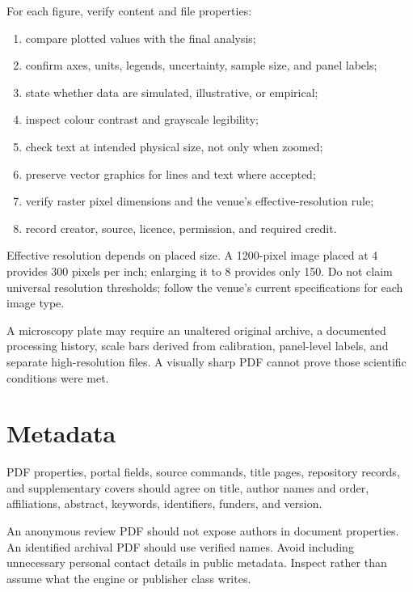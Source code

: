 For each figure, verify content and file properties:

\begin{enumerate}
  \item compare plotted values with the final analysis;
  \item confirm axes, units, legends, uncertainty, sample size, and panel labels;
  \item state whether data are simulated, illustrative, or empirical;
  \item inspect colour contrast and grayscale legibility;
  \item check text at intended physical size, not only when zoomed;
  \item preserve vector graphics for lines and text where accepted;
  \item verify raster pixel dimensions and the venue's effective-resolution rule;
  \item record creator, source, licence, permission, and required credit.
\end{enumerate}

Effective resolution depends on placed size. A 1200-pixel image placed at
\SI{4}{\inch} provides 300 pixels per inch; enlarging it to
\SI{8}{\inch} provides only 150. Do not claim universal resolution thresholds;
follow the venue's current specifications for each image type.

\begin{scienceinpractice}
A microscopy plate may require an unaltered original archive, a documented
processing history, scale bars derived from calibration, panel-level labels,
and separate high-resolution files. A visually sharp PDF cannot prove those
scientific conditions were met.
\end{scienceinpractice}

\section{Metadata}

PDF properties, portal fields, source commands, title pages, repository records,
and supplementary covers should agree on title, author names and order,
affiliations, abstract, keywords, identifiers, funders, and version.

An anonymous review PDF should not expose authors in document properties. An
identified archival PDF should use verified names. Avoid including unnecessary
personal contact details in public metadata. Inspect rather than assume what the
engine or publisher class writes.

